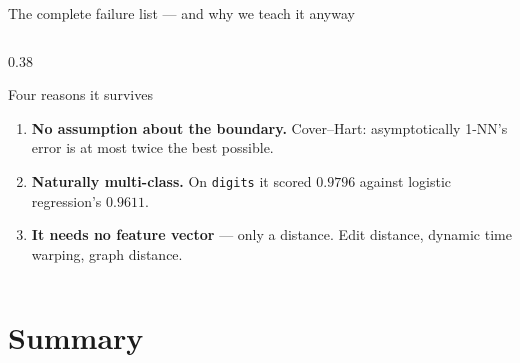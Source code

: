 \documentclass[aspectratio=169]{beamer}
\begin{document}
\begin{frame}[shrink=9]{The complete failure list --- and why we teach it
anyway}
\begin{columns}[T]
\begin{column}{0.38\textwidth}
\begin{exampleblock}{Four reasons it survives}
\begin{enumerate}
          earning its keep.
        \item \textbf{No assumption about the boundary.} Cover--Hart:
          asymptotically 1-NN's error is at most twice the best possible.
        \item \textbf{Naturally multi-class.} On \texttt{digits} it scored
          $0.9796$ against logistic regression's $0.9611$.
        \item \textbf{It needs no feature vector} --- only a distance. Edit
          distance, dynamic time warping, graph distance.
      \end{enumerate}
    \end{exampleblock}
  \end{column}
\end{columns}
\end{frame}

\section{Summary}
\label{sec:summary}
\end{document}
